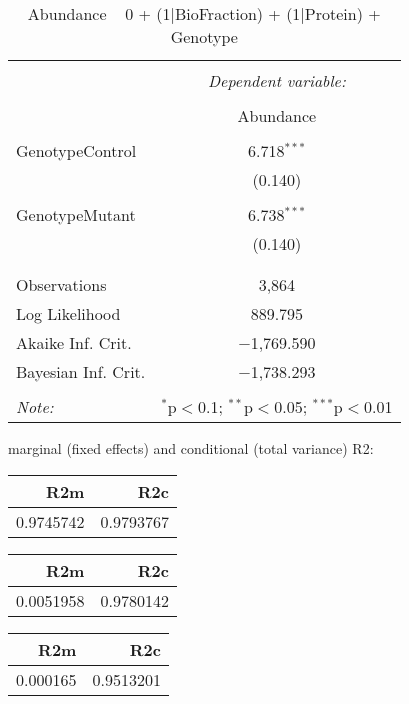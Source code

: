 \documentclass[11pt]{report}
\begin{document}
\begin{table}[!htbp] \centering 
  \caption{Abundance ~ 0 + (1|BioFraction) + (1|Protein) + Genotype} 
  \label{} 
\begin{tabular}{@{\extracolsep{5pt}}lc} 
\\[-1.8ex]\hline 
\hline \\[-1.8ex] 
 & \multicolumn{1}{c}{\textit{Dependent variable:}} \\ 
\cline{2-2} 
\\[-1.8ex] & Abundance \\ 
\hline \\[-1.8ex] 
 GenotypeControl & 6.718$^{***}$ \\ 
  & (0.140) \\ 
  & \\ 
 GenotypeMutant & 6.738$^{***}$ \\ 
  & (0.140) \\ 
  & \\ 
\hline \\[-1.8ex] 
Observations & 3,864 \\ 
Log Likelihood & 889.795 \\ 
Akaike Inf. Crit. & $-$1,769.590 \\ 
Bayesian Inf. Crit. & $-$1,738.293 \\ 
\hline 
\hline \\[-1.8ex] 
\textit{Note:}  & \multicolumn{1}{r}{$^{*}$p$<$0.1; $^{**}$p$<$0.05; $^{***}$p$<$0.01} \\ 
\end{tabular} 
\end{table} 
marginal (fixed effects) and conditional (total variance) R2:

\begin{tabular}{r|r}
\hline
R2m & R2c\\
\hline
0.9745742 & 0.9793767\\
\hline
\end{tabular}

\begin{tabular}{r|r}
\hline
R2m & R2c\\
\hline
0.0051958 & 0.9780142\\
\hline
\end{tabular}

\begin{tabular}{r|r}
\hline
R2m & R2c\\
\hline
0.000165 & 0.9513201\\
\hline
\end{tabular}
\end{document}
